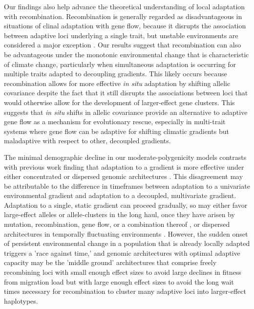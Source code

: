\documentclass[9pt,twocolumn,twoside,lineno]{new_article}
\begin{document}
Our findings also help advance the theoretical understanding
of local adaptation with recombination.
Recombination is generally regarded as disadvantageous
in situations of clinal adaptation
with gene flow, because it disrupts the
association between adaptive loci 
underlying a single trait,
but unstable environments are considered a major exception \cite{tigano}.
Our results suggest that recombination can also
be advantageous under the monotonic environmental
change that is characteristic of climate change,
particularly when simultaneous adaptation is occurring
for multiple traits adapted to decoupling gradients.
This likely occurs because recombination
allows for more effective \textit{in situ} adaptation
by shifting allelic covariance despite the fact that
it still disrupts the associations between loci
that would otherwise allow for the development of
larger-effect gene clusters.
This suggests that \textit{in situ} shifts in allelic covariance
provide an alternative to adaptive gene flow as a mechanism for evolutionary rescue,
especially in multi-trait systems where gene flow can be adaptive
for shifting climatic gradients but maladaptive with
respect to other, decoupled gradients.
 
The minimal demographic decline
in our moderate-polygenicity models
contrasts with previous work finding that adaptation
to a gradient is more effective under either
concentrated or dispersed genomic architectures \cite{yeaman_whitlock}.
This disagreement may be attributable to the
difference in timeframes between adaptation to a univariate environmental gradient
and adaptation to a decoupled, multivariate gradient.
Adaptation to a single, static gradient can proceed gradually,
so may either favor large-effect alleles or allele-clusters in the long haul,
once they have arisen by mutation, recombination, gene flow, or a combination thereof \cite{yeaman_amnat,yeaman_review},
or dispersed architectures in temporally fluctuating environments \cite{burger,kondrashov,yeaman_review,yeaman_whitlock}.
However, the sudden onset of persistent environmental change 
in a population that is already locally adapted triggers a 'race against time,' 
and genomic architectures with
optimal adaptive capacity may be the 'middle ground' architectures that comprise
freely recombining loci with small enough effect sizes to avoid large declines in fitness from migration load
but with large enough effect sizes to avoid the long wait times necessary
for recombination to cluster many adaptive loci into larger-effect haplotypes.
 
\end{document}
